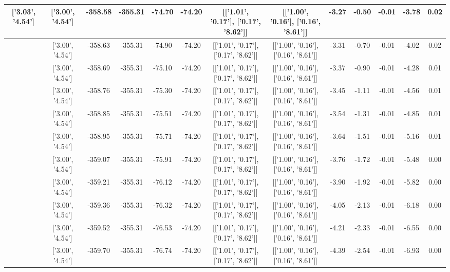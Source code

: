 \begin{table}[htbp]
\begin{adjustbox}{angle=90}
\begin{tabular}{|c|c|c|c|c|c|c|c|c|c|c|c|c|}
 ['3.03', '4.54'] & ['3.00', '4.54'] & -358.58 & -355.31 & -74.70 & -74.20 & [['1.01', '0.17'], ['0.17', '8.62']] & [['1.00', '0.16'], ['0.16', '8.61']] & -3.27 & -0.50 & -0.01 & -3.78 & 0.02\\ \hline
 ['3.04', '4.54'] & ['3.00', '4.54'] & -358.63 & -355.31 & -74.90 & -74.20 & [['1.01', '0.17'], ['0.17', '8.62']] & [['1.00', '0.16'], ['0.16', '8.61']] & -3.31 & -0.70 & -0.01 & -4.02 & 0.02\\ \hline
 ['3.05', '4.54'] & ['3.00', '4.54'] & -358.69 & -355.31 & -75.10 & -74.20 & [['1.01', '0.17'], ['0.17', '8.62']] & [['1.00', '0.16'], ['0.16', '8.61']] & -3.37 & -0.90 & -0.01 & -4.28 & 0.01\\ \hline
 ['3.07', '4.54'] & ['3.00', '4.54'] & -358.76 & -355.31 & -75.30 & -74.20 & [['1.01', '0.17'], ['0.17', '8.62']] & [['1.00', '0.16'], ['0.16', '8.61']] & -3.45 & -1.11 & -0.01 & -4.56 & 0.01\\ \hline
 ['3.08', '4.54'] & ['3.00', '4.54'] & -358.85 & -355.31 & -75.51 & -74.20 & [['1.01', '0.17'], ['0.17', '8.62']] & [['1.00', '0.16'], ['0.16', '8.61']] & -3.54 & -1.31 & -0.01 & -4.85 & 0.01\\ \hline
 ['3.09', '4.54'] & ['3.00', '4.54'] & -358.95 & -355.31 & -75.71 & -74.20 & [['1.01', '0.17'], ['0.17', '8.62']] & [['1.00', '0.16'], ['0.16', '8.61']] & -3.64 & -1.51 & -0.01 & -5.16 & 0.01\\ \hline
 ['3.10', '4.55'] & ['3.00', '4.54'] & -359.07 & -355.31 & -75.91 & -74.20 & [['1.01', '0.17'], ['0.17', '8.62']] & [['1.00', '0.16'], ['0.16', '8.61']] & -3.76 & -1.72 & -0.01 & -5.48 & 0.00\\ \hline
 ['3.11', '4.55'] & ['3.00', '4.54'] & -359.21 & -355.31 & -76.12 & -74.20 & [['1.01', '0.17'], ['0.17', '8.62']] & [['1.00', '0.16'], ['0.16', '8.61']] & -3.90 & -1.92 & -0.01 & -5.82 & 0.00\\ \hline
 ['3.13', '4.55'] & ['3.00', '4.54'] & -359.36 & -355.31 & -76.32 & -74.20 & [['1.01', '0.17'], ['0.17', '8.62']] & [['1.00', '0.16'], ['0.16', '8.61']] & -4.05 & -2.13 & -0.01 & -6.18 & 0.00\\ \hline
 ['3.14', '4.55'] & ['3.00', '4.54'] & -359.52 & -355.31 & -76.53 & -74.20 & [['1.01', '0.17'], ['0.17', '8.62']] & [['1.00', '0.16'], ['0.16', '8.61']] & -4.21 & -2.33 & -0.01 & -6.55 & 0.00\\ \hline
 ['3.15', '4.55'] & ['3.00', '4.54'] & -359.70 & -355.31 & -76.74 & -74.20 & [['1.01', '0.17'], ['0.17', '8.62']] & [['1.00', '0.16'], ['0.16', '8.61']] & -4.39 & -2.54 & -0.01 & -6.93 & 0.00\\ \hline

\end{tabular}
\end{adjustbox}
\end{table}
